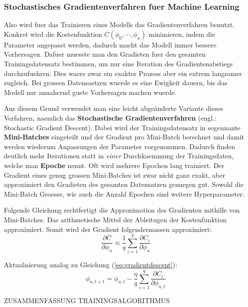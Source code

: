 \documentclass[../main]{subfiles}
\begin{document}
\subsubsection{Stochastisches Gradientenverfahren fuer Machine Learning}
Also wird fuer das Trainieren eines Modells das Gradientenverfahren benutzt.
Konkret wird die Kostenfunktion $C(\phi_0,\cdots,\phi_n)$ minimieren, indem die Parameter angepasst werden, dadurch macht das Modell immer bessere Vorhersagen.
Dafuer muesste man den Gradieten fuer den gesamten Trainingsdatensatz bestimmen, um nur eine Iteration des Gradientenabstiegs durchzufuehren.
Dies waere zwar ein exakter Prozess aber ein extrem langsamer zugleich.
Bei grossen Datensaetzen wuerde es eine Ewigkeit dauern, bis das Modell nur annahernd guete Vorhersagen machen wuerde.
\par\medskip
Aus diesem Grund verwendet man eine leicht abgeänderte Variante dieses Verfahren, naemlich das \textbf{Stochastische Gradientenverfahren} (engl.: Stochastic Gradient Descent).
Dabei wird der Trainingsdatensatz in sogennante \textbf{Mini-Batches} eingeteilt und der Gradient pro Mini-Batch berechnet und damit werden wiederum Anpassungen der Parameter vorgenommen.
Dadurch finden deutlich mehr Iterationen statt in \textit{einer} Durchkaemmung der Trainingsdaten, welche man \textbf{Epoche} nennt. Oft wird mehrere Epochen lang trainiert. 
Der Gradient eines genug grossen Mini-Batches ist zwar nicht ganz exakt, aber approximiert den Gradieten des gesamten Datensatzen genuegen gut.
Sowohl die Mini-Batch Groesse, wie auch die Anzahl Epochen sind weitere Hyperparameter.
\par\medskip
Folgende Gleichung rechtfertigt die Approximation des Gradienten mithilfe von Mini-Batches.
Das arithmetische Mittel der Ableitugen der Kostenfunktion approximiert.
Somit wird der Gradient folgendermassen approximiert:
\begin{equation}\label{eq:minibatch_deriv}
    \frac{\partial\bar{C}}{\partial\phi_n} \approx \frac{1}{q}\sum_{i=1}^{q} \frac{\partial C_i}{\partial\phi_n}
\end{equation}

Aktualisierung analog zu Gleichung (\ref{eq:gradientdescent}):
\begin{equation}\label{eq:sgd}
    \phi_{n,t+1} = \phi_{n,t} - \frac{\eta}{q} \sum_{i=1}^{q} \frac{\partial C_i}{\partial \phi_{n,t}}
\end{equation}


ZUSAMMENFASSUNG TRAININGSALGORITHMUS
\end{document}
